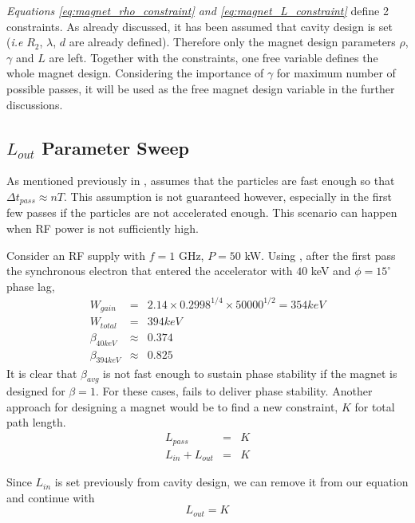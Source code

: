 \documentclass[a4paper,oneside,12pt]{report}
\numberwithin{equation}{chapter}
\begin{document}
\textit{Equations \ref{eq:magnet_rho_constraint} and \ref{eq:magnet_L_constraint}} define 2 constraints. As already discussed, it has been assumed that cavity design is set (\textit{i.e} $R_2$, $\lambda$, $d$ are already defined).
Therefore only the magnet design parameters $\rho$, $\gamma$ and $L$ are left. Together with the constraints, one free variable defines the whole magnet design. 
Considering the importance of $\gamma$ for maximum number of possible passes, it will be used as the free magnet design variable in the further discussions.


\subsection{$L_{out}$ Parameter Sweep} \label{sec:parameter_sweep}

As mentioned previously in ,  assumes that the particles are fast enough so that $\Delta t_{pass} \approx n T$. 
This assumption is not guaranteed however, especially in the first few passes if the particles are not accelerated enough. 
This scenario can happen when RF power is not sufficiently high. 

Consider an RF supply with $f=1$ GHz, $P=50$ kW. Using , 
after the first pass the synchronous electron that entered the accelerator with $40$ keV and $\phi=15^\circ$ phase lag,
\begin{eqnarray*}
    W_{gain} &=& 2.14\times0.2998^{1/4}\times 50000^{1/2} = 354keV \\
    W_{total} &=& 394 keV \\
    \beta_{40keV} &\approx& 0.374 \\
    \beta_{394keV} &\approx& 0.825
\end{eqnarray*}
It is clear that $\beta_{avg}$ is not fast enough to sustain phase stability if the magnet is designed for $\beta = 1$. 
For these cases,  fails to deliver phase stability.
Another approach for designing a magnet would be to find a new constraint, $K$ for total path length.
\begin{eqnarray*}
    L_{pass} &=& K \\
    L_{in} + L_{out} &=& K
\end{eqnarray*}

Since $L_{in}$ is set previously from cavity design, we can remove it from our equation and continue with
\begin{equation} \label{eq:mag_sweep_constraint}
    L_{out} = K
\end{equation}
\end{document}
